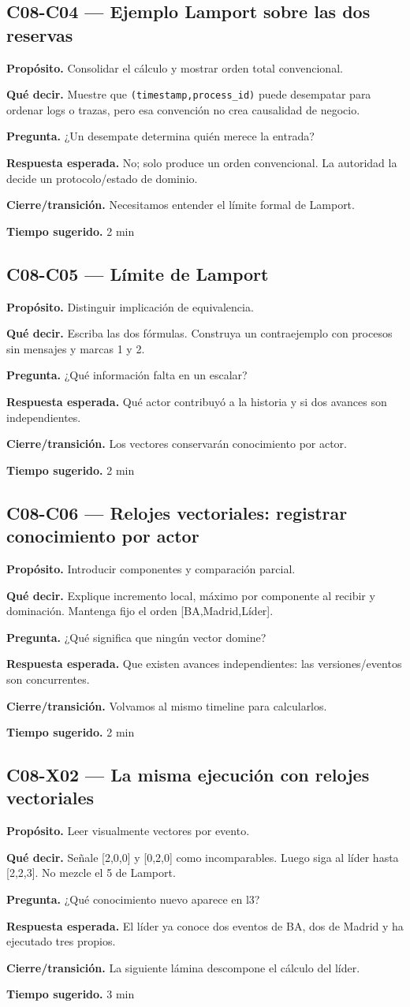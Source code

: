 \documentclass[variant=docente,cover=institutional,mode=screen]{ua-engineering-v6-article}
\newcommand{\FrameField}[2]{\par\noindent\textbf{#1.} #2\par}
\begin{document}
\subsection*{C08-C04 --- Ejemplo Lamport sobre las dos reservas}
\FrameField{Propósito}{Consolidar el cálculo y mostrar orden total convencional.}
\FrameField{Qué decir}{Muestre que \texttt{(timestamp,process\_id)} puede desempatar para ordenar logs o trazas, pero esa convención no crea causalidad de negocio.}
\FrameField{Pregunta}{¿Un desempate determina quién merece la entrada?}
\FrameField{Respuesta esperada}{No; solo produce un orden convencional. La autoridad la decide un protocolo/estado de dominio.}
\FrameField{Cierre/transición}{Necesitamos entender el límite formal de Lamport.}
\FrameField{Tiempo sugerido}{2 min}

\subsection*{C08-C05 --- Límite de Lamport}
\FrameField{Propósito}{Distinguir implicación de equivalencia.}
\FrameField{Qué decir}{Escriba las dos fórmulas. Construya un contraejemplo con procesos sin mensajes y marcas 1 y 2.}
\FrameField{Pregunta}{¿Qué información falta en un escalar?}
\FrameField{Respuesta esperada}{Qué actor contribuyó a la historia y si dos avances son independientes.}
\FrameField{Cierre/transición}{Los vectores conservarán conocimiento por actor.}
\FrameField{Tiempo sugerido}{2 min}

\subsection*{C08-C06 --- Relojes vectoriales: registrar conocimiento por actor}
\FrameField{Propósito}{Introducir componentes y comparación parcial.}
\FrameField{Qué decir}{Explique incremento local, máximo por componente al recibir y dominación. Mantenga fijo el orden [BA,Madrid,Líder].}
\FrameField{Pregunta}{¿Qué significa que ningún vector domine?}
\FrameField{Respuesta esperada}{Que existen avances independientes: las versiones/eventos son concurrentes.}
\FrameField{Cierre/transición}{Volvamos al mismo timeline para calcularlos.}
\FrameField{Tiempo sugerido}{2 min}

\subsection*{C08-X02 --- La misma ejecución con relojes vectoriales}
\FrameField{Propósito}{Leer visualmente vectores por evento.}
\FrameField{Qué decir}{Señale [2,0,0] y [0,2,0] como incomparables. Luego siga al líder hasta [2,2,3]. No mezcle el 5 de Lamport.}
\FrameField{Pregunta}{¿Qué conocimiento nuevo aparece en l3?}
\FrameField{Respuesta esperada}{El líder ya conoce dos eventos de BA, dos de Madrid y ha ejecutado tres propios.}
\FrameField{Cierre/transición}{La siguiente lámina descompone el cálculo del líder.}
\FrameField{Tiempo sugerido}{3 min}
\end{document}
